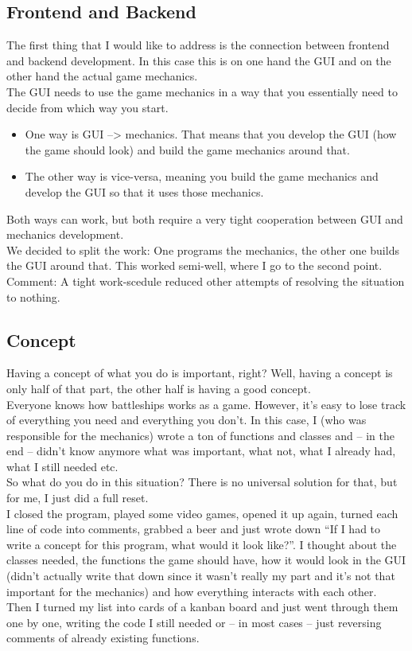 \documentclass[12pt]{scrartcl}
\begin{document}
	\subsection{Frontend and Backend}
	The first thing that I would like to address is the connection between frontend and backend development. In this case this is on one hand the GUI and on the other hand the actual game mechanics.\\
	The GUI needs to use the game mechanics in a way that you essentially need to decide from which way you start.
	\begin{itemize}
		\item One way is GUI --> mechanics. That means that you develop the GUI (how the game should look) and build the game mechanics around that.
		\item The other way is vice-versa, meaning you build the game mechanics and develop the GUI so that it uses those mechanics.
	\end{itemize}

	Both ways can work, but both require a very tight cooperation between GUI and mechanics development. \\

	We decided to split the work: One programs the mechanics, the other one builds the GUI around that. This worked semi-well, where I go to the second point.
	Comment: A tight work-scedule reduced other attempts of resolving the situation to nothing.\\
	\subsection{Concept}
	Having a concept of what you do is important, right? Well, having a concept is only half of that part, the other half is having a good concept. \\

	Everyone knows how battleships works as a game. However, it's easy to lose track of everything you need and everything you don't. In this case, I (who was responsible for the mechanics) wrote a ton of functions and classes and -- in the end -- didn't know anymore what was important, what not, what I already had, what I still needed etc.\\

	So what do you do in this situation? There is no universal solution for that, but for me, I just did a full reset.\\
	I closed the program, played some video games, opened it up again, turned each line of code into comments, grabbed a beer and just wrote down \enquote{If I had to write a concept for this program, what would it look like?}. I thought about the classes needed, the functions the game should have, how it would look in the GUI (didn't actually write that down since it wasn't really my part and it's not that important for the mechanics) and how everything interacts with each other. \\
	Then I turned my list into cards of a kanban board and just went through them one by one, writing the code I still needed or -- in most cases -- just reversing comments of already existing functions. \\
\end{document}
